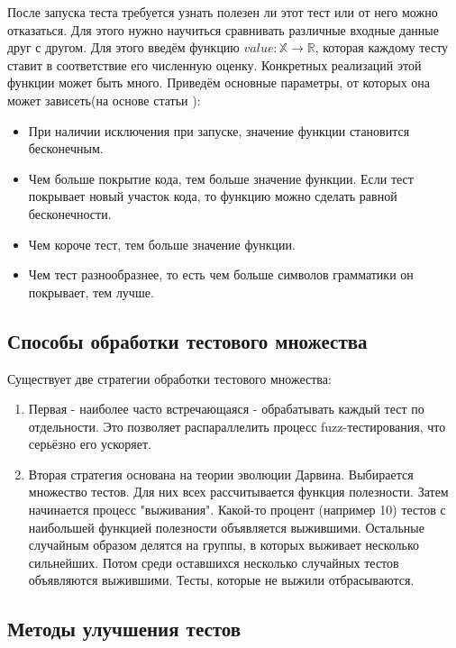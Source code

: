 \documentclass[a4paper]{article}
\begin{document}
После запуска теста требуется узнать полезен ли этот тест или от него можно отказаться. Для этого нужно научиться сравнивать различные входные данные друг с другом.
Для этого введём функцию $value : \mathbb {X} \rightarrow \mathbb {R}$, которая каждому тесту ставит в соответствие его численную оценку. Конкретных реализаций этой функции может быть много. Приведём основные параметры, от которых она может зависеть(на основе статьи \cite{litlink2}):
\begin{itemize}
    \item При наличии исключения при запуске, значение функции становится бесконечным.
    \item Чем больше покрытие кода, тем больше значение функции. Если тест покрывает новый участок кода, то функцию можно сделать равной бесконечности.
    \item Чем короче тест, тем больше значение функции.
    \item Чем тест разнообразнее, то есть чем больше символов грамматики он покрывает, тем лучше.
\end{itemize}

\subsection{Способы обработки тестового множества}
\indent

Существует две стратегии обработки тестового множества:

\begin{enumerate}
\item Первая - наиболее часто встречающаяся - обрабатывать каждый тест по отдельности\cite{litlink9}. Это позволяет распараллелить процесс fuzz-тестирования, что серьёзно его ускоряет. 
\item Вторая стратегия основана на теории эволюции Дарвина\cite{litlink2}. Выбирается множество тестов. Для них всех рассчитывается функция полезности. Затем начинается процесс "выживания". Какой-то процент (например 10) тестов с наибольшей функцией полезности объявляется выжившими. Остальные случайным образом делятся на группы, в которых выживает несколько сильнейших. Потом среди оставшихся несколько случайных тестов объявляются выжившими. Тесты, которые не выжили отбрасываются.
\end{enumerate}

\subsection{Методы улучшения тестов}
\indent
\end{document}
